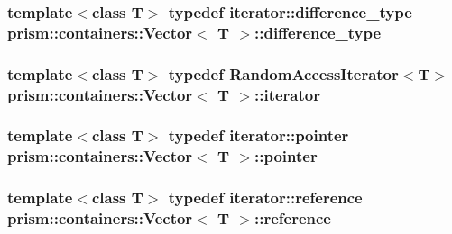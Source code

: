 \subsubsection[{\texorpdfstring{difference\+\_\+type}{difference_type}}]{\setlength{\rightskip}{0pt plus 5cm}template$<$class T$>$ typedef iterator\+::difference\+\_\+type {\bf prism\+::containers\+::\+Vector}$<$ T $>$\+::{\bf difference\+\_\+type}}\hypertarget{classprism_1_1containers_1_1_vector_af003b53eb746fe1f294136b6d3384b18}{}\label{classprism_1_1containers_1_1_vector_af003b53eb746fe1f294136b6d3384b18}
\subsubsection[{\texorpdfstring{iterator}{iterator}}]{\setlength{\rightskip}{0pt plus 5cm}template$<$class T$>$ typedef Random\+Access\+Iterator$<$T$>$ {\bf prism\+::containers\+::\+Vector}$<$ T $>$\+::{\bf iterator}}\hypertarget{classprism_1_1containers_1_1_vector_a00f2237bf0922d6299f1004c0a717fd5}{}\label{classprism_1_1containers_1_1_vector_a00f2237bf0922d6299f1004c0a717fd5}
\subsubsection[{\texorpdfstring{pointer}{pointer}}]{\setlength{\rightskip}{0pt plus 5cm}template$<$class T$>$ typedef iterator\+::pointer {\bf prism\+::containers\+::\+Vector}$<$ T $>$\+::{\bf pointer}}\hypertarget{classprism_1_1containers_1_1_vector_a7205d98d3099bffc475e77acf7c8e2a1}{}\label{classprism_1_1containers_1_1_vector_a7205d98d3099bffc475e77acf7c8e2a1}
\subsubsection[{\texorpdfstring{reference}{reference}}]{\setlength{\rightskip}{0pt plus 5cm}template$<$class T$>$ typedef iterator\+::reference {\bf prism\+::containers\+::\+Vector}$<$ T $>$\+::{\bf reference}}\hypertarget{classprism_1_1containers_1_1_vector_a557fd3cca76315ccd4112d8b7398e43c}{}\label{classprism_1_1containers_1_1_vector_a557fd3cca76315ccd4112d8b7398e43c}
